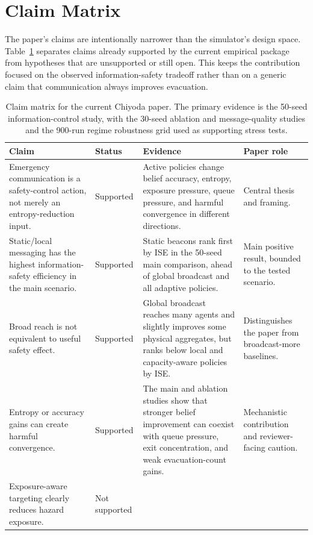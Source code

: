 \section{Claim Matrix}
\label{sec:claims}

The paper's claims are intentionally narrower than the simulator's design
space. Table~\ref{tab:claim-matrix} separates claims already supported by the
current empirical package from hypotheses that are unsupported or still open.
This keeps the contribution focused on the observed information-safety
tradeoff rather than on a generic claim that communication always improves
evacuation.

\begin{table}[!t]
\centering
\caption{Claim matrix for the current Chiyoda paper. The primary evidence is
the 50-seed information-control study, with the 30-seed ablation and
message-quality studies and the 900-run regime robustness grid used as
supporting stress tests.}
\label{tab:claim-matrix}
\begin{tabular}{p{}p{}p{}p{}}
\toprule
Claim & Status & Evidence & Paper role \\
\midrule
Emergency communication is a safety-control action, not merely an
entropy-reduction input. & Supported & Active policies change belief accuracy,
entropy, exposure pressure, queue pressure, and harmful convergence in
different directions. & Central thesis and framing. \\
\addlinespace
Static/local messaging has the highest information-safety efficiency in the
main scenario. & Supported & Static beacons rank first by ISE in the 50-seed
main comparison, ahead of global broadcast and all adaptive policies. & Main
positive result, bounded to the tested scenario. \\
\addlinespace
Broad reach is not equivalent to useful safety effect. & Supported & Global
broadcast reaches many agents and slightly improves some physical aggregates,
but ranks below local and capacity-aware policies by ISE. & Distinguishes the
paper from broadcast-more baselines. \\
\addlinespace
Entropy or accuracy gains can create harmful convergence. & Supported & The
main and ablation studies show that stronger belief improvement can coexist
with queue pressure, exit concentration, and weak evacuation-count gains. &
Mechanistic contribution and reviewer-facing caution. \\
\addlinespace
Exposure-aware targeting clearly reduces hazard exposure. & Not supported &

\end{tabular}
\end{table}
